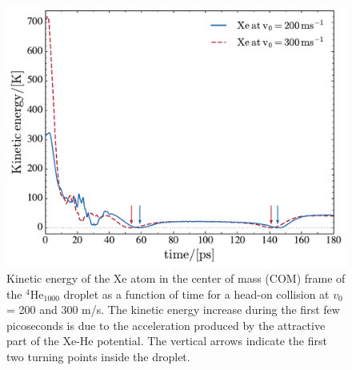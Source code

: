 \begin{figure}[!]
\centerline{\includegraphics[width=0.9\linewidth,clip]{kinetic-energy}}
\caption{\label{fig2} 
Kinetic  energy  of the Xe atom in the center of mass (COM) frame of the $^4$He$_{1000}$ droplet 
as a function of time for  a head-on collision  at $v_0$= 200 and 300 m/s. The kinetic energy increase 
during the first few picoseconds is due to the
acceleration produced by the attractive part of the Xe-He potential. The vertical arrows indicate the first two turning points inside the droplet.
}
\end{figure}
%
